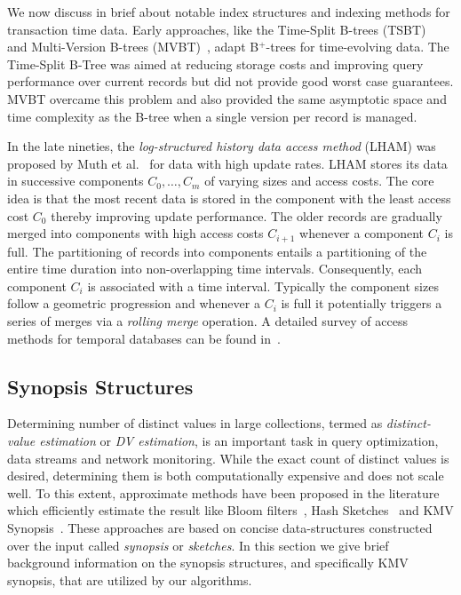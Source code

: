 We now discuss in brief about notable index structures and indexing methods for transaction time data. Early approaches, like the Time-Split B-trees (TSBT)~\cite{lomet1993exploiting} and Multi-Version B-trees (MVBT)~\cite{becker1996asymptotically}, adapt B$^+$-trees for time-evolving data. The Time-Split B-Tree was aimed at reducing storage costs and improving query performance over current records but did not provide good worst case guarantees. MVBT overcame this problem and also provided the same asymptotic space and time complexity as the B-tree when a single version per record is managed. 

In the late nineties, the \emph{log-structured history data access method} (LHAM) was proposed by Muth et al.~\cite{Muth2000} for data with high update rates. LHAM stores its data in successive components $C_0,\ldots,C_m$ of varying sizes and access costs. The core idea is that the most recent data is stored in the component with the least access cost $C_0$ thereby improving update performance. The older records are gradually merged into components with high access costs $C_{i+1}$ whenever a component $C_i$ is full. The partitioning of records into components entails a partitioning of the entire time duration into non-overlapping time intervals. Consequently, each component $C_i$ is associated with a time interval. Typically the component sizes follow a geometric progression and whenever a $C_i$ is full it potentially triggers a series of merges via a \emph{rolling merge} operation. A detailed survey of access methods for temporal databases can be found in~\cite{salzberg:csur1999}.

\subsection{Synopsis Structures}

Determining number of distinct values in large collections, termed as \emph{distinct-value estimation} or \emph{DV estimation}, is an important task in query optimization, data streams and network monitoring. While the exact count of distinct values is desired, determining them is both computationally expensive and does not scale well. To this extent, approximate methods have been proposed in the literature which efficiently estimate the result like Bloom filters~\cite{bloom1970space}, Hash Sketches~\cite{flajolet1985probabilistic} and KMV Synopsis~\cite{kmv:sigmod}. These approaches are based on concise data-structures constructed over the input called \emph{synopsis} or \emph{sketches}. In this section we give brief background information on the synopsis structures, and specifically KMV synopsis, that are utilized by our algorithms.

